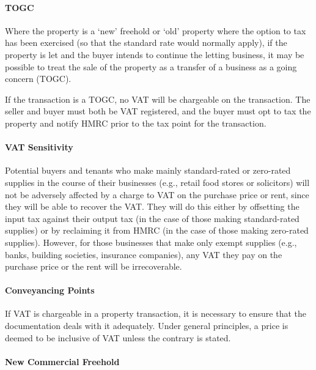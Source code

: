 \documentclass[
]{article}
\begin{document}
\hypertarget{togc}{%
\paragraph{TOGC}\label{togc}}

Where the property is a `new' freehold or `old' property where the
option to tax has been exercised (so that the standard rate would
normally apply), if the property is let and the buyer intends to
continue the letting business, it may be possible to treat the sale of
the property as a transfer of a business as a going concern (TOGC).

If the transaction is a TOGC, no VAT will be chargeable on the
transaction. The seller and buyer must both be VAT registered, and the
buyer must opt to tax the property and notify HMRC prior to the tax
point for the transaction.

\hypertarget{vat-sensitivity}{%
\paragraph{VAT Sensitivity}\label{vat-sensitivity}}

Potential buyers and tenants who make mainly standard-rated or
zero-rated supplies in the course of their businesses (e.g., retail food
stores or solicitors) will not be adversely affected by a charge to VAT
on the purchase price or rent, since they will be able to recover the
VAT. They will do this either by offsetting the input tax against their
output tax (in the case of those making standard-rated supplies) or by
reclaiming it from HMRC (in the case of those making zero-rated
supplies). However, for those businesses that make only exempt supplies
(e.g., banks, building societies, insurance companies), any VAT they pay
on the purchase price or the rent will be irrecoverable.

\hypertarget{conveyancing-points}{%
\paragraph{Conveyancing Points}\label{conveyancing-points}}

If VAT is chargeable in a property transaction, it is necessary to
ensure that the documentation deals with it adequately. Under general
principles, a price is deemed to be inclusive of VAT unless the contrary
is stated.

\hypertarget{new-commercial-freehold}{%
\paragraph{New Commercial Freehold}\label{new-commercial-freehold}}
\end{document}
